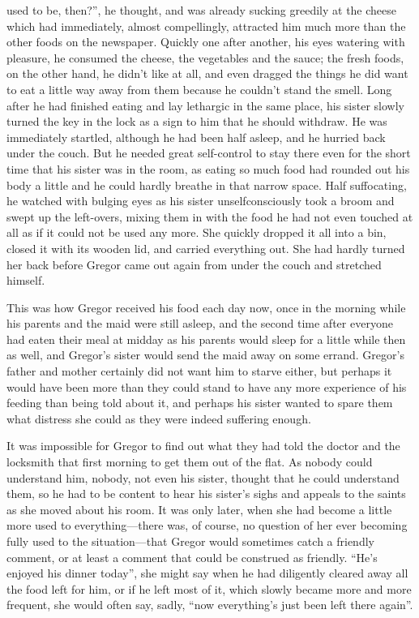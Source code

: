 used to be, then?”, he thought, and was already sucking greedily at the
cheese which had immediately, almost compellingly, attracted him much
more than the other foods on the newspaper. Quickly one after another,
his eyes watering with pleasure, he consumed the cheese, the vegetables
and the sauce; the fresh foods, on the other hand, he didn’t like at
all, and even dragged the things he did want to eat a little way away
from them because he couldn’t stand the smell. Long after he had
finished eating and lay lethargic in the same place, his sister slowly
turned the key in the lock as a sign to him that he should withdraw. He
was immediately startled, although he had been half asleep, and he
hurried back under the couch. But he needed great self-control to stay
there even for the short time that his sister was in the room, as
eating so much food had rounded out his body a little and he could
hardly breathe in that narrow space. Half suffocating, he watched with
bulging eyes as his sister unselfconsciously took a broom and swept up
the left-overs, mixing them in with the food he had not even touched at
all as if it could not be used any more. She quickly dropped it all
into a bin, closed it with its wooden lid, and carried everything out.
She had hardly turned her back before Gregor came out again from under
the couch and stretched himself.

This was how Gregor received his food each day now, once in the morning
while his parents and the maid were still asleep, and the second time
after everyone had eaten their meal at midday as his parents would
sleep for a little while then as well, and Gregor’s sister would send
the maid away on some errand. Gregor’s father and mother certainly did
not want him to starve either, but perhaps it would have been more than
they could stand to have any more experience of his feeding than being
told about it, and perhaps his sister wanted to spare them what
distress she could as they were indeed suffering enough.

It was impossible for Gregor to find out what they had told the doctor
and the locksmith that first morning to get them out of the flat. As
nobody could understand him, nobody, not even his sister, thought that
he could understand them, so he had to be content to hear his sister’s
sighs and appeals to the saints as she moved about his room. It was
only later, when she had become a little more used to everything—there
was, of course, no question of her ever becoming fully used to the
situation—that Gregor would sometimes catch a friendly comment, or at
least a comment that could be construed as friendly. “He’s enjoyed his
dinner today”, she might say when he had diligently cleared away all
the food left for him, or if he left most of it, which slowly became
more and more frequent, she would often say, sadly, “now everything’s
just been left there again”.

